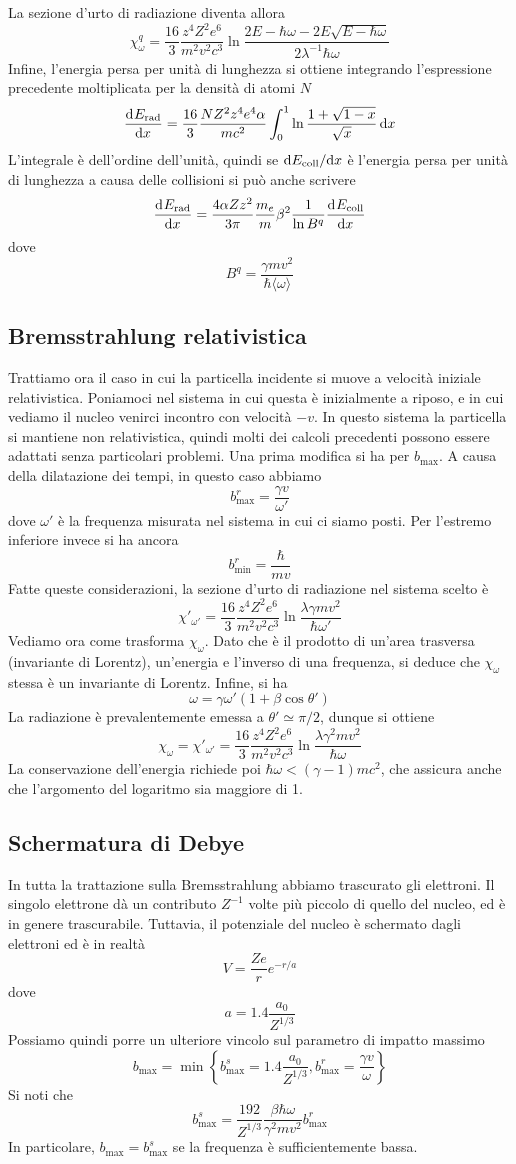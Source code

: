 \documentclass{article}
\begin{document}
La sezione d'urto di radiazione diventa allora
\[\chi_\omega^q=\frac{16}{3}\frac{z^4Z^2e^6}{m^2v^2c^3}\ln\frac{2E-\hbar\omega-2E\sqrt{E-\hbar\omega}}{2\lambda^{-1}\hbar\omega}\]
Infine, l'energia persa per unità di lunghezza si ottiene integrando l'espressione precedente moltiplicata per la densità di atomi $N$
\[\dfrac{\mathrm{d} ^{}E_\textrm{rad}}{\mathrm{d} {x}^{}}=\frac{16}{3}\frac{NZ^2z^4e^4\alpha}{mc^2}\int_{0}^{1}\ln\frac{1+\sqrt{1-x}}{\sqrt{x}}\, \mathrm{d} x\]
L'integrale è dell'ordine dell'unità, quindi se $\mathrm{d} E_\textrm{coll}/\mathrm{d} x$ è l'energia persa per unità di lunghezza a causa delle collisioni si può anche scrivere
\[\dfrac{\mathrm{d} ^{}E_\textrm{rad}}{\mathrm{d} {x}^{}}=\frac{4\alpha Zz^2}{3\pi}\frac{m_e}{m}\beta^2\frac{1}{\ln B^q}\dfrac{\mathrm{d} ^{}E_\textrm{coll}}{\mathrm{d} {x}^{}}\]
dove
\[B^q=\frac{\gamma mv^2}{\hbar\langle\omega\rangle}\]
\subsection{Bremsstrahlung relativistica}
Trattiamo ora il caso in cui la particella incidente si muove a velocità iniziale relativistica. Poniamoci nel sistema in cui questa è inizialmente a riposo, e in cui vediamo il nucleo venirci incontro con velocità $-v$. In questo sistema la particella si mantiene non relativistica, quindi molti dei calcoli precedenti possono essere adattati senza particolari problemi. Una prima modifica si ha per $b_\textrm{max}$. A causa della dilatazione dei tempi, in questo caso abbiamo
\[b^r_\textrm{max}=\frac{\gamma v}{\omega'}\]
dove $\omega'$ è la frequenza misurata nel sistema in cui ci siamo posti. Per l'estremo inferiore invece si ha ancora
\[b^r_\textrm{min}=\frac{\hbar}{mv}\]
Fatte queste considerazioni, la sezione d'urto di radiazione nel sistema scelto è
\[\chi'_{\omega'}=\frac{16}{3}\frac{z^4Z^2e^6}{m^2v^2c^3}\ln\frac{\lambda\gamma mv^2}{\hbar\omega'}\]
Vediamo ora come trasforma $\chi_\omega$. Dato che è il prodotto di un'area trasversa (invariante di Lorentz), un'energia e l'inverso di una frequenza, si deduce che $\chi_\omega$ stessa è un invariante di Lorentz. Infine, si ha
\[\omega=\gamma\omega'(1+\beta\cos\theta')\]
La radiazione è prevalentemente emessa a $\theta'\simeq\pi /2$, dunque si ottiene
\[\chi_\omega=\chi'_{\omega'}=\frac{16}{3}\frac{z^4Z^2e^6}{m^2v^2c^3}\ln\frac{\lambda\gamma^2 mv^2}{\hbar\omega}\]
La conservazione dell'energia richiede poi $\hbar\omega<(\gamma-1)mc^2$, che assicura anche che l'argomento del logaritmo sia maggiore di 1.
\subsection{Schermatura di Debye}
In tutta la trattazione sulla Bremsstrahlung abbiamo trascurato gli elettroni. Il singolo elettrone dà un contributo $Z^{-1}$ volte più piccolo di quello del nucleo, ed è in genere trascurabile. Tuttavia, il potenziale del nucleo è schermato dagli elettroni ed è in realtà
\[V=\frac{Ze}{r}e^{-r/a}\]
dove
\[a=1.4\frac{a_0}{Z^{1/3}}\]
Possiamo quindi porre un ulteriore vincolo sul parametro di impatto massimo
\[b_\textrm{max}=\min\left\{b_\textrm{max}^s=1.4\frac{a_0}{Z^{1/3}},b_\textrm{max}^r=\frac{\gamma v}{\omega}\right\}\]
Si noti che
\[b^s_\textrm{max}=\frac{192}{Z^{1/3}}\frac{\beta\hbar\omega}{\gamma^2 mv^2}b^r_\textrm{max}\]
In particolare, $b_\textrm{max}=b^s_\textrm{max}$ se la frequenza è sufficientemente bassa.
\end{document}
